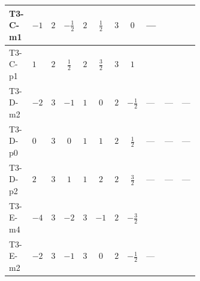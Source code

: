 \documentclass[8pt]{article}
\begin{document}
\begin{landscape}
\begin{longtable}{@{}llcccccc >{\raggedright\arraybackslash}p{0.21\linewidth} >{\raggedright\arraybackslash}p{0.21\linewidth} >{\raggedright\arraybackslash}p{0.21\linewidth}@{}}
\midrule
T3-C-m1 & $-1$ & $2$ & $-\frac{1}{2}$ & $2$ & $\frac{1}{2}$ & $3$ & $0$ & --- & \scriptsize\adjustbox{max width=\linewidth}{$\begin{gathered} -9 {g_2}^2 {\lambda_{12}^{(A)}}\end{gathered}$} & \scriptsize\adjustbox{max width=\linewidth}{$\begin{gathered} +8 {\lambda_{12}^{(1)}} {\lambda_{12}^{(A)}}\end{gathered}$} \\
\midrule
T3-C-p1 & $1$ & $2$ & $\frac{1}{2}$ & $2$ & $\frac{3}{2}$ & $3$ & $1$ & \scriptsize\adjustbox{max width=\linewidth}{$\begin{gathered} +{g_1}^2 \left(18 {g_2}^2-15 {\lambda_{12}^{(A)}}\right)\end{gathered}$} & \scriptsize\adjustbox{max width=\linewidth}{$\begin{gathered} -9 {g_2}^2 {\lambda_{12}^{(A)}}\end{gathered}$} & \scriptsize\adjustbox{max width=\linewidth}{$\begin{gathered} +8 {\lambda_{12}^{(1)}} {\lambda_{12}^{(A)}}\end{gathered}$} \\
\midrule
T3-D-m2 & $-2$ & $3$ & $-1$ & $1$ & $0$ & $2$ & $-\frac{1}{2}$ & --- & --- & --- \\
\midrule
T3-D-p0 & $0$ & $3$ & $0$ & $1$ & $1$ & $2$ & $\frac{1}{2}$ & --- & --- & --- \\
\midrule
T3-D-p2 & $2$ & $3$ & $1$ & $1$ & $2$ & $2$ & $\frac{3}{2}$ & --- & --- & --- \\
\midrule
T3-E-m4 & $-4$ & $3$ & $-2$ & $3$ & $-1$ & $2$ & $-\frac{3}{2}$ & \scriptsize\adjustbox{max width=\linewidth}{$\begin{gathered} +{g_1}^2 \left(16 {g_2}^2-30 {\lambda_{12}^{(A)}}\right)\end{gathered}$} & \scriptsize\adjustbox{max width=\linewidth}{$\begin{gathered} -24 {g_2}^2 {\lambda_{12}^{(A)}}\end{gathered}$} & \scriptsize\adjustbox{max width=\linewidth}{$\begin{gathered} +8 {\lambda_{12}^{(1)}} {\lambda_{12}^{(A)}}\end{gathered}$} \\
\midrule
T3-E-m2 & $-2$ & $3$ & $-1$ & $3$ & $0$ & $2$ & $-\frac{1}{2}$ & --- & \scriptsize\adjustbox{max width=\linewidth}{$\begin{gathered} -24 {g_2}^2 {\lambda_{12}^{(A)}}\end{gathered}$} & \scriptsize\adjustbox{max width=\linewidth}{$\begin{gathered} +8 {\lambda_{12}^{(1)}} {\lambda_{12}^{(A)}}\end{gathered}$} \\

\end{longtable}
\end{landscape}
\end{document}
